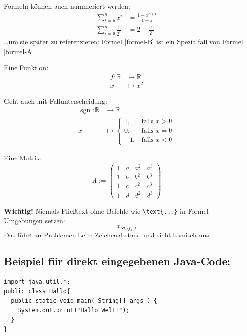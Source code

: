 Formeln können auch nummeriert werden:
\begin{align}
  \sum_{i=0}^{n} x^i &= \frac{1-x^{n+1}}{1-x}       \label{formel-A} \\
  \sum_{i=0}^{n} \frac{1}{2^i} &= 2 - \frac{1}{2^n} \label{formel-B}
\end{align}
\dots um sie später zu referenzieren: Formel \eqref{formel-B} ist ein Spezialfall von Formel \eqref{formel-A}.

Eine Funktion:
\begin{align*}
  f \colon \mathbb{R} &\longrightarrow \mathbb{R} \\
  x &\longmapsto x^2
\end{align*}

Geht auch mit Fallunterscheidung:
\begin{align*}
  \operatorname{sgn} \colon \mathbb{R} &\longrightarrow \mathbb{R} \\
  x &\longmapsto \begin{cases}
    1, & \text{falls } x > 0 \\
    0, & \text{falls } x = 0 \\
    -1, & \text{falls } x < 0
  \end{cases}
\end{align*}

Eine Matrix:
\[
A := \begin{pmatrix}
  1 & a & a^2 & a^3 \\
  1 & b & b^2 & b^3 \\
  1 & c & c^2 & c^3 \\
  1 & d & d^2 & d^3
\end{pmatrix}
\]

\textbf{Wichtig!} Niemals Fließtext ohne Befehle wie \texttt{\textbackslash text\{...\}} in Formel-Umgebungen setzen:
\[
x_{Staffel}
\]
Das führt zu Problemen beim Zeichenabstand und sieht komisch aus.


\subsection*{Beispiel für direkt eingegebenen Java-Code:}
\begin{verbatim}
import java.util.*;
public class Hallo{
  public static void main( String[] args ) {
    System.out.print("Hallo Welt!");
  }
}
\end{verbatim}


